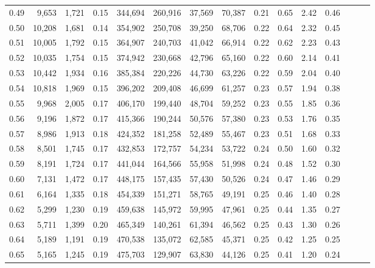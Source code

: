 \begin{tabular}{rrrrrrrrrrrrrrr}
0.49 &   9,653 &  1,721 &  0.15 &  344,694 &  260,916 &   37,569 &   70,387 &  0.21 &  0.65 &  2.42 &      0.46 \\
0.50 &  10,208 &  1,681 &  0.14 &  354,902 &  250,708 &   39,250 &   68,706 &  0.22 &  0.64 &  2.32 &      0.45 \\
0.51 &  10,005 &  1,792 &  0.15 &  364,907 &  240,703 &   41,042 &   66,914 &  0.22 &  0.62 &  2.23 &      0.43 \\
0.52 &  10,035 &  1,754 &  0.15 &  374,942 &  230,668 &   42,796 &   65,160 &  0.22 &  0.60 &  2.14 &      0.41 \\
0.53 &  10,442 &  1,934 &  0.16 &  385,384 &  220,226 &   44,730 &   63,226 &  0.22 &  0.59 &  2.04 &      0.40 \\
0.54 &  10,818 &  1,969 &  0.15 &  396,202 &  209,408 &   46,699 &   61,257 &  0.23 &  0.57 &  1.94 &      0.38 \\
0.55 &   9,968 &  2,005 &  0.17 &  406,170 &  199,440 &   48,704 &   59,252 &  0.23 &  0.55 &  1.85 &      0.36 \\
0.56 &   9,196 &  1,872 &  0.17 &  415,366 &  190,244 &   50,576 &   57,380 &  0.23 &  0.53 &  1.76 &      0.35 \\
0.57 &   8,986 &  1,913 &  0.18 &  424,352 &  181,258 &   52,489 &   55,467 &  0.23 &  0.51 &  1.68 &      0.33 \\
0.58 &   8,501 &  1,745 &  0.17 &  432,853 &  172,757 &   54,234 &   53,722 &  0.24 &  0.50 &  1.60 &      0.32 \\
0.59 &   8,191 &  1,724 &  0.17 &  441,044 &  164,566 &   55,958 &   51,998 &  0.24 &  0.48 &  1.52 &      0.30 \\
0.60 &   7,131 &  1,472 &  0.17 &  448,175 &  157,435 &   57,430 &   50,526 &  0.24 &  0.47 &  1.46 &      0.29 \\
0.61 &   6,164 &  1,335 &  0.18 &  454,339 &  151,271 &   58,765 &   49,191 &  0.25 &  0.46 &  1.40 &      0.28 \\
0.62 &   5,299 &  1,230 &  0.19 &  459,638 &  145,972 &   59,995 &   47,961 &  0.25 &  0.44 &  1.35 &      0.27 \\
0.63 &   5,711 &  1,399 &  0.20 &  465,349 &  140,261 &   61,394 &   46,562 &  0.25 &  0.43 &  1.30 &      0.26 \\
0.64 &   5,189 &  1,191 &  0.19 &  470,538 &  135,072 &   62,585 &   45,371 &  0.25 &  0.42 &  1.25 &      0.25 \\
0.65 &   5,165 &  1,245 &  0.19 &  475,703 &  129,907 &   63,830 &   44,126 &  0.25 &  0.41 &  1.20 &      0.24 \\

\end{tabular}
